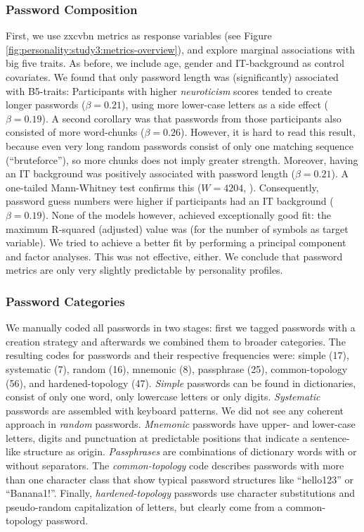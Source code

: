 \subsubsection{Password Composition}
First, we use zxcvbn metrics as response variables (see Figure \ref{fig:personality:study3:metrics-overview}), and explore marginal associations with big five traits. As before, we include age, gender and IT-background as control covariates. We found that only password length was (significantly) associated with B5-traits: Participants with higher \textit{neuroticism} scores tended to create longer passwords ($\beta = 0.21$), using more lower-case letters as a side effect ($\beta = 0.19$). A second corollary was that passwords from those participants also consisted of more word-chunks ($\beta= 0.26$). However, it is hard to read this result, because even very long random passwords consist of only one matching sequence (``bruteforce''), so more chunks does not imply greater strength. 
Moreover, having an IT background was positively associated with password length ($\beta = 0.21$). A one-tailed Mann-Whitney test confirms this ($W=4204$, ). Consequently, password guess numbers were higher if participants had an IT background ($\beta=0.19$). None of the models however, achieved exceptionally good fit: the maximum R-squared (adjusted) value was  (for the number of symbols as target variable). We tried to achieve a better fit by performing a principal component and factor analyses. This was not effective, either. We conclude that password metrics are only very slightly predictable by personality profiles. 


\subsubsection{Password Categories}
We manually coded all passwords in two stages: first we tagged passwords with a creation strategy and afterwards we combined them to broader categories. The resulting codes for passwords and their respective frequencies were: simple (17), systematic (7), random (16), mnemonic (8), passphrase (25), common-topology (56), and hardened-topology (47). \textit{Simple} passwords can be found in dictionaries, consist of only one word, only lowercase letters or only digits. \textit{Systematic} passwords are assembled with keyboard patterns. We did not see any coherent approach in \textit{random} passwords. \textit{Mnemonic} passwords have upper- and lower-case letters, digits and punctuation at predictable positions that indicate a sentence-like structure as origin. \textit{Passphrases} are combinations of dictionary words with or without separators. The \textit{common-topology} code describes passwords with more than one character class that show typical password structures like ``hello123'' or ``Banana1!''. Finally, \textit{hardened-topology} passwords use character substitutions and pseudo-random capitalization of letters, but clearly come from a common-topology password. 


